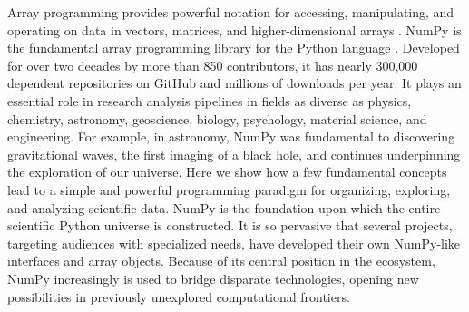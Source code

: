 




Array programming provides powerful notation for accessing,
manipulating, and operating on data in vectors, matrices, and
higher-dimensional arrays \cite{iverson1980notation}.
NumPy is the fundamental array programming library for the Python language
\cite{dubois2007guest,oliphant2007python,millman2011python,perez2011python}.
Developed for over two decades by more than 850 contributors, 
it has nearly 300,000 dependent repositories on GitHub and millions of
downloads per year.
It plays an essential role in research analysis pipelines in fields as
diverse as physics, chemistry, astronomy, geoscience, biology, psychology,
material science, and engineering.
For example, in astronomy, NumPy was fundamental to discovering gravitational
waves\cite{pycbc}, the first imaging of a black hole\cite{eht-imaging}, and
continues underpinning the exploration of our
universe\cite{jenness2018lsst}.
Here we show how a few fundamental concepts lead to a simple and
powerful programming paradigm for organizing, exploring, and analyzing
scientific data.
NumPy is the foundation upon which the entire scientific Python
universe is constructed. It is so pervasive that several projects,
targeting audiences with specialized needs, have developed their own
NumPy-like interfaces and array objects.  Because of its central position in the
ecosystem, NumPy increasingly is used to bridge disparate
technologies, opening new possibilities in previously unexplored computational frontiers.

